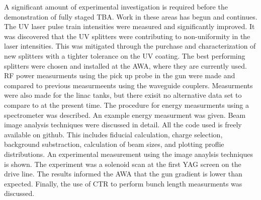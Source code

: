 A significant amount of experimental investigation is 
required before the demonstration of fully staged TBA.
Work in these areas has begun and continues. 
The UV laser pulse train intensities were measured and significantly improved.
It was discovered that the UV splitters were contributing to non-uniformity in the laser intensities. 
This was mitigated through the purchase and characterization of 
new splitters with a tighter tolerance on the UV coating. 
The best performing splitters were chosen and installed at the AWA, 
where they are currently used.
RF power measurments using the pick up probe in the gun were made and compared to previous 
measurmeents using the waveguide couplers. 
Measurments were also made for the linac tanks, but there exisit no alternative data 
set to compare to at the present time.
The procedure for energy measurments using a spectrometer was described.
An example energy measurment was given.
Beam image analysis techniques were discussed in detail.
All the code used is freely available on github.
This includes fiducial calculation, charge selection, background substraction, 
calculation of beam sizes, and plotting proflie distributions. 
An experimental measurement using the image anaylsis techniques is shown. 
The experiment was a solenoid scan at the first YAG screen on the drive line.
The results informed the AWA that the gun gradient is lower than expected.
Finally, the use of CTR to perform bunch length measurments was discussed.


